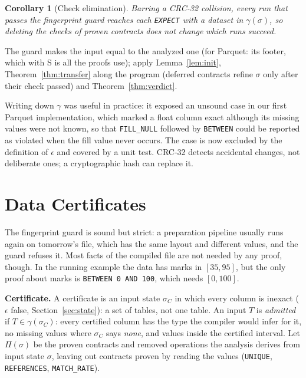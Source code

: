 \documentclass[conference]{IEEEtran}
\newtheorem{corollary}{Corollary}
\begin{document}
\begin{corollary}[Check elimination]\label{cor:checks}
Barring a CRC-32 collision, every run that passes the fingerprint guard reaches each
\texttt{EXPECT} with a dataset in $\gamma(\sigma)$, so deleting the checks of proven contracts does
not change which runs succeed.
\end{corollary}
\begin{IEEEproof}
The guard makes the input equal to the analyzed one (for Parquet: its footer, which with S is all
the proofs use); apply Lemma~\ref{lem:init}, Theorem~\ref{thm:transfer} along the program (deferred
contracts refine $\sigma$ only after their check passed) and Theorem~\ref{thm:verdict}.
\end{IEEEproof}

Writing down $\gamma$ was useful in practice: it exposed an unsound case in our first Parquet
implementation, which marked a float column exact although its missing values were not known, so
that \texttt{FILL\_NULL} followed by \texttt{BETWEEN} could be reported as violated when the fill
value never occurs. The case is now excluded by the definition of $\epsilon$ and covered by a unit
test. CRC-32 detects accidental changes, not deliberate ones; a cryptographic hash can replace it.

\section{Data Certificates}\label{sec:cert}

The fingerprint guard is sound but strict: a preparation pipeline usually runs again on tomorrow's
file, which has the same layout and different values, and the guard refuses it. Most facts of the
compiled file are not needed by any proof, though. In the running example the data has marks in
$[35,95]$, but the only proof about marks is \texttt{BETWEEN 0 AND 100}, which needs $[0,100]$.

\textbf{Certificate.} A certificate is an input state $\sigma_C$ in which every column is inexact
($\epsilon$ false, Section~\ref{sec:state}): a set of tables, not one table. An input $T$ is
\emph{admitted} if $T \in \gamma(\sigma_C)$: every certified column has the type the compiler would
infer for it, no missing values where $\sigma_C$ says \textit{none}, and values inside the
certified interval. Let
$\Pi(\sigma)$ be the proven contracts and removed operations the analysis derives from input state
$\sigma$, leaving out contracts proven by reading the values (\texttt{UNIQUE},
\texttt{REFERENCES}, \texttt{MATCH\_RATE}).
\end{document}

